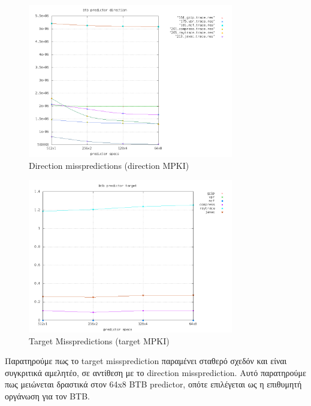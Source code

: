 \documentclass[a4paper,10pt]{article}
\begin{document}
\begin{figure}[H]
	\centering
	\includegraphics[width=0.8\textwidth]{../Results/part3/results_B1_direction.png}
	\caption{Direction misspredictions (direction MPKI)}
\end{figure}

\begin{figure}[H]
	\centering
	\includegraphics[width=0.8\textwidth]{../Results/part3/results_B1_target.png}
	\caption{Target Misspredictions (target MPKI)}
\end{figure}


Παρατηρούμε πως το target missprediction παραμένει σταθερό σχεδόν και είναι
συγκριτικά αμελητέο, σε αντίθεση
με το direction missprediction. Αυτό παρατηρούμε πως μειώνεται δραστικά στον
64x8 BTB predictor, οπότε επιλέγεται ως η επιθυμητή οργάνωση για τον BTB.

%
\end{document}
